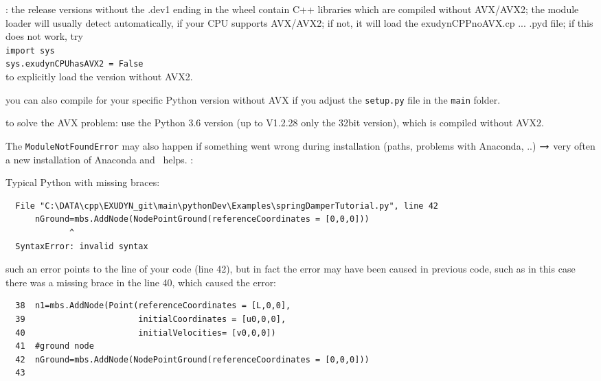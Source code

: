 \item[$\ra$] : the release versions without the .dev1 ending in the wheel contain C++ libraries which are compiled without AVX/AVX2; the module loader will usually detect automatically, if your CPU supports AVX/AVX2; if not, it will load the exudynCPPnoAVX.cp ... .pyd file; if this does not work, try\\
\texttt{import sys}\\
\texttt{sys.exudynCPUhasAVX2 = False}\\
to explicitly load the version without AVX2.
\item[$\ra$] you can also compile for your specific Python version without AVX if you adjust the \texttt{setup.py} file in the \texttt{main} folder.
\item[$\ra$]  to solve the AVX problem: use the Python 3.6 version (up to \codeName V1.2.28 only the 32bit version), which is compiled without AVX2.
\item[$\ra$] The \texttt{ModuleNotFoundError} may also happen if something went wrong during installation (paths, problems with Anaconda, ..) $\ra$ very often a new installation of Anaconda and \codeName\ helps.
\ei
\ei
\noindent {}:
\bi
  \item Typical Python  with missing braces:
\plainlststyle
\begin{lstlisting}
  File "C:\DATA\cpp\EXUDYN_git\main\pythonDev\Examples\springDamperTutorial.py", line 42
      nGround=mbs.AddNode(NodePointGround(referenceCoordinates = [0,0,0]))
             ^
  SyntaxError: invalid syntax
\end{lstlisting}
\onlyRST{\rstStartNewLine}
%
\item[$\ra$] such an error points to the line of your code (line 42), but in fact the error may have been caused in previous code, such as in this case there was a missing brace in the line 40, which caused the error:
\pythonstyle\begin{lstlisting}
  38  n1=mbs.AddNode(Point(referenceCoordinates = [L,0,0], 
  39                       initialCoordinates = [u0,0,0], 
  40                       initialVelocities= [v0,0,0])	
  41  #ground node
  42  nGround=mbs.AddNode(NodePointGround(referenceCoordinates = [0,0,0]))
  43  
\end{lstlisting}
